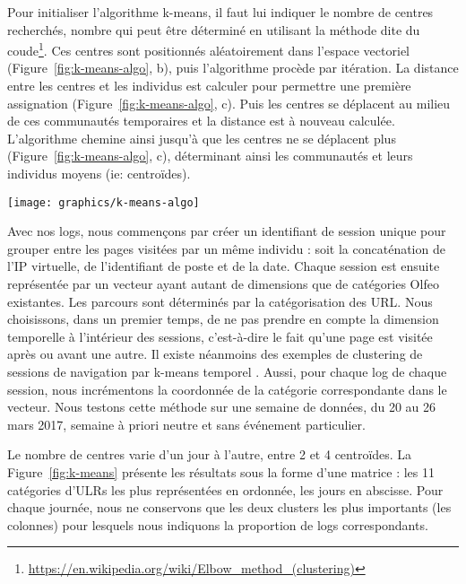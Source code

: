 \documentclass[symmetric,justified,marginals=raggedouter]{tufte-book}
\begin{document}
Pour initialiser l'algorithme k-means, il faut lui indiquer le nombre de centres recherchés, nombre qui peut être déterminé en utilisant la méthode dite du coude\footnote{\RaggedOuter \url{https://en.wikipedia.org/wiki/Elbow\_method\_(clustering)}}. Ces centres sont positionnés aléatoirement dans l'espace vectoriel (Figure~\ref{fig:k-means-algo}, b), puis l'algorithme procède par itération. La distance entre les centres et les individus est calculer pour permettre une première assignation (Figure~\ref{fig:k-means-algo}, c). Puis les centres se déplacent au milieu de ces communautés temporaires et la distance est à nouveau calculée. L'algorithme chemine ainsi jusqu'à que les centres ne se déplacent plus (Figure~\ref{fig:k-means-algo}, c), déterminant ainsi les communautés et leurs individus moyens (ie: centroïdes).

\begin{figure*}
  \texttt{[image: graphics/k-means-algo]}
  \caption{Exemple de fonctionnement de l'algorithme k-means avec 2 centres (bleu et rouge)}
  \label{fig:k-means-algo}
\end{figure*}

Avec nos logs, nous commençons par créer un identifiant de session unique pour grouper entre les pages visitées par un même individu : soit la concaténation de l'IP virtuelle, de l'identifiant de poste et de la date. Chaque session est ensuite représentée par un vecteur ayant autant de dimensions que de catégories Olfeo existantes. Les parcours sont déterminés par la catégorisation des URL. Nous choisissons, dans un premier temps, de ne pas prendre en compte la dimension temporelle à l'intérieur des sessions, c'est-à-dire le fait qu'une page est visitée après ou avant une autre. Il existe néanmoins des exemples de clustering de sessions de navigation par k-means temporel \citep{stevanovic_unsupervised_2011}. Aussi, pour chaque log de chaque session, nous incrémentons la coordonnée de la catégorie correspondante dans le vecteur. Nous testons cette méthode sur une semaine de données, du 20 au 26 mars 2017, semaine à priori neutre et sans événement particulier. 

Le nombre de centres varie d'un jour à l'autre, entre 2 et 4 centroïdes. La Figure~\ref{fig:k-means} présente les résultats sous la forme d'une matrice : les 11 catégories d'ULRs les plus représentées en ordonnée, les jours en abscisse. Pour chaque journée, nous ne conservons que les deux clusters les plus importants (les colonnes) pour lesquels nous indiquons la proportion de logs correspondants. 
\end{document}
